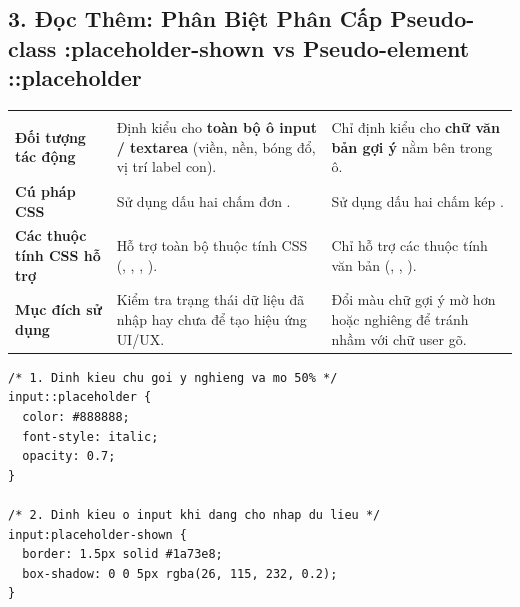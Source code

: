 \subsection{3. Đọc Thêm: Phân Biệt Phân Cấp Pseudo-class :placeholder-shown vs Pseudo-element ::placeholder}

\begin{prettyTableBox}
\small
{}
\begin{tabularx}{\linewidth}{K{2.8cm} Z Z}
 &  &  \\
\textbf{Đối tượng tác động} & Định kiểu cho \textbf{toàn bộ ô input / textarea} (viền, nền, bóng đổ, vị trí label con). & Chỉ định kiểu cho \textbf{chữ văn bản gợi ý} nằm bên trong ô. \\
\textbf{Cú pháp CSS} & Sử dụng dấu hai chấm đơn . & Sử dụng dấu hai chấm kép . \\
\textbf{Các thuộc tính CSS hỗ trợ} & Hỗ trợ toàn bộ thuộc tính CSS (, , , ). & Chỉ hỗ trợ các thuộc tính văn bản (, , ). \\
\textbf{Mục đích sử dụng} & Kiểm tra trạng thái dữ liệu đã nhập hay chưa để tạo hiệu ứng UI/UX. & Đổi màu chữ gợi ý mờ hơn hoặc nghiêng để tránh nhầm với chữ user gõ. \\
\end{tabularx}
\end{prettyTableBox}

\begin{tipBox}
\begin{codeWindow}
\begin{lstlisting}[language=HTML5]
/* 1. Dinh kieu chu goi y nghieng va mo 50% */
input::placeholder {
  color: #888888;
  font-style: italic;
  opacity: 0.7;
}

/* 2. Dinh kieu o input khi dang cho nhap du lieu */
input:placeholder-shown {
  border: 1.5px solid #1a73e8;
  box-shadow: 0 0 5px rgba(26, 115, 232, 0.2);
}
\end{lstlisting}
\end{codeWindow}
\end{tipBox}





